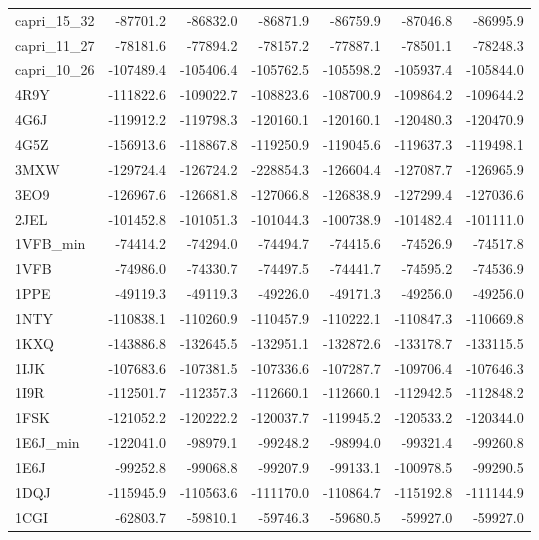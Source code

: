 \begin{table}[h]
\begin{center}
\begin{tabular}{ l | r | r | r | r | r | r }
       capri\_15\_32 & -87701.2 & -86832.0 & -86871.9 & -86759.9 & -87046.8 & -86995.9 \\
       capri\_11\_27 & -78181.6 & -77894.2 & -78157.2 & -77887.1 & -78501.1 & -78248.3 \\
       capri\_10\_26 & -107489.4 & -105406.4 & -105762.5 & -105598.2 & -105937.4 & -105844.0 \\
       4R9Y & -111822.6 & -109022.7 & -108823.6 & -108700.9 & -109864.2 & -109644.2 \\
       4G6J & -119912.2 & -119798.3 & -120160.1 & -120160.1 & -120480.3 & -120470.9 \\
       4G5Z & -156913.6 & -118867.8 & -119250.9 & -119045.6 & -119637.3 & -119498.1 \\
       3MXW & -129724.4 & -126724.2 & -228854.3 & -126604.4 & -127087.7 & -126965.9 \\
       3EO9 & -126967.6 & -126681.8 & -127066.8 & -126838.9 & -127299.4 & -127036.6 \\
       2JEL & -101452.8 & -101051.3 & -101044.3 & -100738.9 & -101482.4 & -101111.0 \\
       1VFB\_min & -74414.2 & -74294.0 & -74494.7 & -74415.6 & -74526.9 & -74517.8 \\
       1VFB & -74986.0 & -74330.7 & -74497.5 & -74441.7 & -74595.2 & -74536.9 \\
       1PPE & -49119.3 & -49119.3 & -49226.0 & -49171.3 & -49256.0 & -49256.0 \\
       1NTY & -110838.1 & -110260.9 & -110457.9 & -110222.1 & -110847.3 & -110669.8 \\
       1KXQ & -143886.8 & -132645.5 & -132951.1 & -132872.6 & -133178.7 & -133115.5 \\
       1IJK & -107683.6 & -107381.5 & -107336.6 & -107287.7 & -109706.4 & -107646.3 \\
       1I9R & -112501.7 & -112357.3 & -112660.1 & -112660.1 & -112942.5 & -112848.2 \\
       1FSK & -121052.2 & -120222.2 & -120037.7 & -119945.2 & -120533.2 & -120344.0 \\
       1E6J\_min & -122041.0 & -98979.1 & -99248.2 & -98994.0 & -99321.4 & -99260.8 \\
       1E6J & -99252.8 & -99068.8 & -99207.9 & -99133.1 & -100978.5 & -99290.5 \\
       1DQJ & -115945.9 & -110563.6 & -111170.0 & -110864.7 & -115192.8 & -111144.9 \\
       1CGI & -62803.7 & -59810.1 & -59746.3 & -59680.5 & -59927.0 & -59927.0 \\

\end{tabular}
\end{center}
\end{table}
